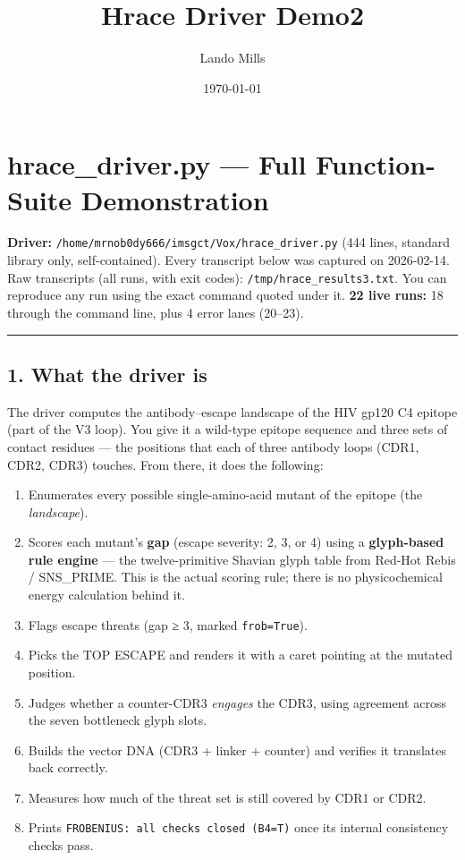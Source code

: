 \documentclass[12pt,a4paper]{article}
\title{Hrace Driver Demo2}
\date{\today}
\author{Lando Mills}
\providecommand{\tightlist}{%
  \setlength{\itemsep}{0pt}\setlength{\parskip}{0pt}%
}
\begin{document}
\maketitle
\hypertarget{hrace_driver.py-full-function-suite-demonstration}{%
\section{hrace\_driver.py --- Full Function-Suite
Demonstration}\label{hrace_driver.py-full-function-suite-demonstration}}

\textbf{Driver:} \texttt{/home/mrnob0dy666/imsgct/Vox/hrace\_driver.py}
(444 lines, standard library only, self-contained). Every transcript
below was captured on 2026-02-14. Raw transcripts (all runs, with exit
codes): \texttt{/tmp/hrace\_results3.txt}. You can reproduce any run
using the exact command quoted under it. \textbf{22 live runs:} 18
through the command line, plus 4 error lanes (20--23).

\begin{center}\rule{0.5\linewidth}{0.5pt}\end{center}

\hypertarget{what-the-driver-is}{%
\subsection{1. What the driver is}\label{what-the-driver-is}}

The driver computes the antibody--escape landscape of the HIV gp120 C4
epitope (part of the V3 loop). You give it a wild-type epitope sequence
and three sets of contact residues --- the positions that each of three
antibody loops (CDR1, CDR2, CDR3) touches. From there, it does the
following:

\begin{enumerate}
\def\labelenumi{\arabic{enumi}.}
\tightlist
\item
  Enumerates every possible single-amino-acid mutant of the epitope (the
  \emph{landscape}).
\item
  Scores each mutant's \textbf{gap} (escape severity: 2, 3, or 4) using
  a \textbf{glyph-based rule engine} --- the twelve-primitive Shavian
  glyph table from Red-Hot Rebis / SNS\_PRIME. This is the actual
  scoring rule; there is no physicochemical energy calculation behind
  it.
\item
  Flags escape threats (gap ≥ 3, marked \texttt{frob=True}).
\item
  Picks the TOP ESCAPE and renders it with a caret pointing at the
  mutated position.
\item
  Judges whether a counter-CDR3 \emph{engages} the CDR3, using agreement
  across the seven bottleneck glyph slots.
\item
  Builds the vector DNA (CDR3 + linker + counter) and verifies it
  translates back correctly.
\item
  Measures how much of the threat set is still covered by CDR1 or CDR2.
\item
  Prints \texttt{FROBENIUS:\ all\ checks\ closed\ (B4=T)} once its
  internal consistency checks pass.
\end{enumerate}
\end{document}
